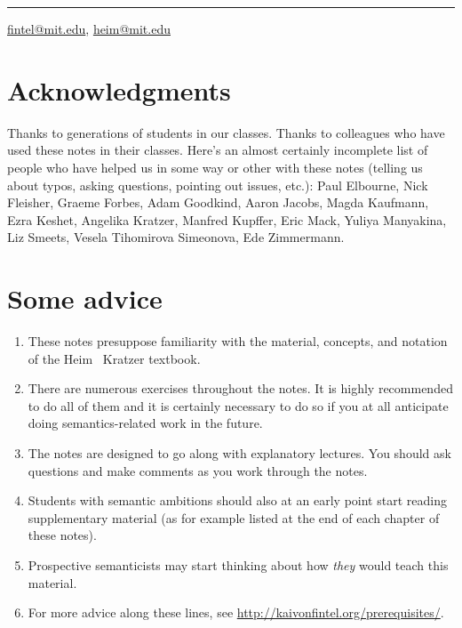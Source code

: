 \plainbreak{1}

\href{mailto:fintel@mit.edu}{fintel@mit.edu}, \href{mailto:heim@mit.edu}{heim@mit.edu}

\cleardoublepage

\null
\vfill \ba 

\section*{Acknowledgments}

Thanks to generations of students in our classes. Thanks to colleagues who have
used these notes in their classes. Here's an almost certainly incomplete list of
people who have helped us in some way or other with these notes (telling us
about typos, asking questions, pointing out issues, etc.): Paul Elbourne, Nick
Fleisher, Graeme Forbes, Adam Goodkind, Aaron Jacobs, Magda Kaufmann, Ezra
Keshet, Angelika Kratzer, Manfred Kupffer, Eric Mack, Yuliya Manyakina, Liz
Smeets, Vesela Tihomirova Simeonova, Ede Zimmermann.

\section*{Some advice}
\begin{enumerate}
\item These notes presuppose familiarity with the material, concepts, and
  notation of the Heim \amp\ Kratzer textbook.
\item There are numerous exercises throughout the notes. It is highly
  recommended to do all of them and it is certainly necessary to do so if you at
  all anticipate doing semantics-related work in the future.
\item The notes are designed to go along with explanatory lectures. You should
  ask questions and make comments as you work through the notes.
\item Students with semantic ambitions should also at an early point start
  reading supplementary material (as for example listed at the end of each
  chapter of these notes).
\item Prospective semanticists may start thinking about how \emph{they} would
  teach this material.
\item For more advice along these lines, see
  \url{http://kaivonfintel.org/prerequisites/}.
\end{enumerate}

\ab 
\vfill\null

\newpage\hbox{}
\vfill{\scshape{}}
\vfill\hbox{}\thispagestyle{cleared}
